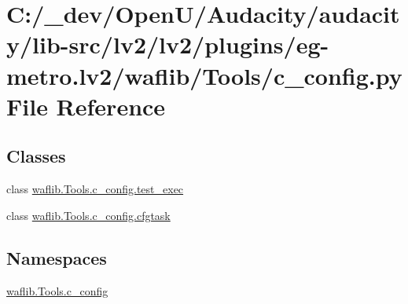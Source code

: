 \hypertarget{lv2_2plugins_2eg-metro_8lv2_2waflib_2_tools_2c__config_8py}{}\section{C\+:/\+\_\+dev/\+Open\+U/\+Audacity/audacity/lib-\/src/lv2/lv2/plugins/eg-\/metro.lv2/waflib/\+Tools/c\+\_\+config.py File Reference}
\label{lv2_2plugins_2eg-metro_8lv2_2waflib_2_tools_2c__config_8py}
\subsection*{Classes}
\begin{DoxyCompactItemize}
\item 
class \hyperlink{classwaflib_1_1_tools_1_1c__config_1_1test__exec}{waflib.\+Tools.\+c\+\_\+config.\+test\+\_\+exec}
\item 
class \hyperlink{classwaflib_1_1_tools_1_1c__config_1_1cfgtask}{waflib.\+Tools.\+c\+\_\+config.\+cfgtask}
\end{DoxyCompactItemize}
\subsection*{Namespaces}
\begin{DoxyCompactItemize}
\item 
 \hyperlink{namespacewaflib_1_1_tools_1_1c__config}{waflib.\+Tools.\+c\+\_\+config}
\end{DoxyCompactItemize}

